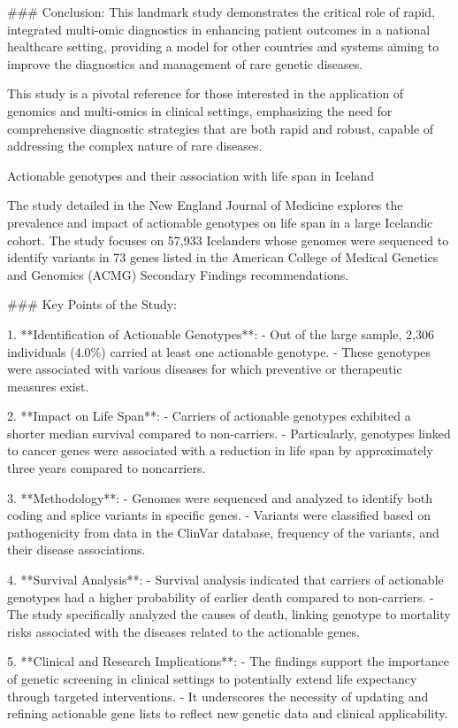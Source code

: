 ### Conclusion:
This landmark study demonstrates the critical role of rapid, integrated multi-omic diagnostics in enhancing patient outcomes in a national healthcare setting, providing a model for other countries and systems aiming to improve the diagnostics and management of rare genetic diseases.

This study is a pivotal reference for those interested in the application of genomics and multi-omics in clinical settings, emphasizing the need for comprehensive diagnostic strategies that are both rapid and robust, capable of addressing the complex nature of rare diseases.

\citep{jensson2023actionable}
Actionable genotypes and their association with life span in Iceland
  
  The study detailed in the New England Journal of Medicine explores the prevalence and impact of actionable genotypes on life span in a large Icelandic cohort. The study focuses on 57,933 Icelanders whose genomes were sequenced to identify variants in 73 genes listed in the American College of Medical Genetics and Genomics (ACMG) Secondary Findings recommendations.

### Key Points of the Study:

1. **Identification of Actionable Genotypes**:
   - Out of the large sample, 2,306 individuals (4.0\%) carried at least one actionable genotype.
   - These genotypes were associated with various diseases for which preventive or therapeutic measures exist.

2. **Impact on Life Span**:
   - Carriers of actionable genotypes exhibited a shorter median survival compared to non-carriers.
   - Particularly, genotypes linked to cancer genes were associated with a reduction in life span by approximately three years compared to noncarriers.

3. **Methodology**:
   - Genomes were sequenced and analyzed to identify both coding and splice variants in specific genes.
   - Variants were classified based on pathogenicity from data in the ClinVar database, frequency of the variants, and their disease associations.

4. **Survival Analysis**:
   - Survival analysis indicated that carriers of actionable genotypes had a higher probability of earlier death compared to non-carriers.
   - The study specifically analyzed the causes of death, linking genotype to mortality risks associated with the diseases related to the actionable genes.

5. **Clinical and Research Implications**:
   - The findings support the importance of genetic screening in clinical settings to potentially extend life expectancy through targeted interventions.
   - It underscores the necessity of updating and refining actionable gene lists to reflect new genetic data and clinical applicability.


